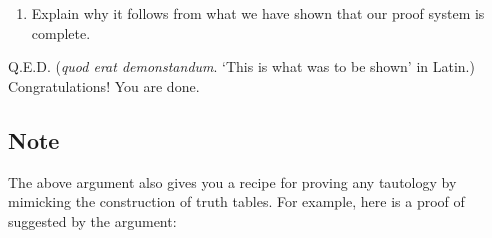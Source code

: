 \begin{enumerate}
\item Explain why it follows from what we have shown that our proof system is 
 complete.




\end{enumerate}


Q.E.D. (\emph{quod erat demonstandum}. `This is what was to be shown' in Latin.) 
Congratulations! You are done.


\subsection*{Note}

The above argument also gives you a recipe for proving any tautology by 
mimicking the construction of truth tables.  For example, here is a proof of 
 suggested by the argument:
\footnotesize

